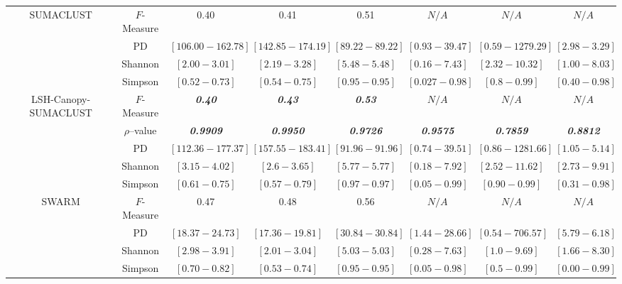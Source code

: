 \documentclass[10pt, conference, compsocconf]{IEEEtran}
\begin{document}
\begin{table}[t]
{\begin{tabular}{|c|c c c c c c c|}
\multirow{4}{*}{SUMACLUST} & $F$-Measure & 0.40 & 0.41 & 0.51 & $N/A$ & $N/A$ & $N/A$\\  
& PD & $\left[106.00-162.78\right]$ & $\left[142.85-174.19\right]$ & $\left[89.22-89.22\right]$ & $\left[0.93-39.47\right]$ & $\left[0.59-1279.29\right]$ & $\left[2.98-3.29\right]$\\ 
& Shannon & $\left[2.00-3.01\right]$ & $\left[2.19-3.28\right]$ & $\left[5.48-5.48\right]$ & $\left[0.16-7.43\right]$ & $\left[2.32-10.32\right]$ & $\left[1.00-8.03\right]$\\
& Simpson & $\left[0.52-0.73\right]$ & $\left[0.54-0.75\right]$ & $\left[0.95-0.95\right]$ & $\left[0.027-0.98\right]$ & $\left[0.8-0.99\right]$ & $\left[0.40-0.98\right]$\\

\hline

\multirow{5}{*}{LSH-Canopy-SUMACLUST} & $F$-Measure & \textit{\textbf{0.40}} & \textit{\textbf{0.43}} & \textit{\textbf{0.53}} & $N/A$ & $N/A$ & $N/A$\\
& $\rho$--value & \textit{\textbf{0.9909}} & \textit{\textbf{0.9950}} & \textit{\textbf{0.9726}} & \textit{\textbf{0.9575}} & \textit{\textbf{0.7859}} & \textit{\textbf{0.8812}}\\ 
& PD & $\left[112.36-177.37\right]$ & $\left[157.55-183.41\right]$ & $\left[91.96-91.96\right]$ & $\left[0.74-39.51\right]$ & $\left[0.86-1281.66\right]$ & $\left[1.05-5.14\right]$\\ 
& Shannon & $\left[3.15-4.02\right]$ & $\left[2.6-3.65\right]$ & $\left[5.77-5.77\right]$ & $\left[0.18-7.92\right]$ & $\left[2.52-11.62\right]$ & $\left[2.73-9.91\right]$\\
& Simpson & $\left[0.61-0.75\right]$ & $\left[0.57-0.79\right]$ & $\left[0.97-0.97\right]$ & $\left[0.05-0.99\right]$ & $\left[0.90-0.99\right]$ & $\left[0.31-0.98\right]$\\


\hline

\multirow{4}{*}{SWARM} & $F$-Measure & 0.47 & 0.48 & 0.56 & $N/A$ & $N/A$ & $N/A$\\
& PD & $\left[18.37-24.73\right]$ & $\left[17.36-19.81\right]$ & $\left[30.84-30.84\right]$ & $\left[1.44-28.66\right]$ & $\left[0.54-706.57\right]$ & $\left[5.79-6.18\right]$\\ 
& Shannon & $\left[2.98-3.91\right]$ & $\left[2.01-3.04\right]$ & $\left[5.03-5.03\right]$ & $\left[0.28-7.63\right]$ & $\left[1.0-9.69\right]$ & $\left[1.66-8.30\right]$\\
& Simpson & $\left[0.70-0.82\right]$ & $\left[0.53-0.74\right]$ & $\left[0.95-0.95\right]$ & $\left[0.05-0.98\right]$ & $\left[0.5-0.99\right]$ & $\left[0.00-0.99\right]$\\


\end{tabular}}
\end{table}
\end{document}
